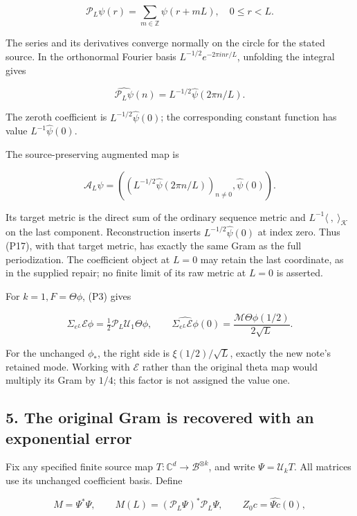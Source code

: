 \[
\mathcal P_L\psi(r)=\sum_{m\in\mathbb Z}\psi(r+mL),\quad 0\le r<L.
\tag{P15}
\]

The series and its derivatives converge normally on the circle for the stated source. In the orthonormal Fourier basis \(L^{-1/2}e^{-2\pi i nr/L}\), unfolding the integral gives

\[
\widehat{\mathcal P_L\psi}(n)
=L^{-1/2}\widehat\psi(2\pi n/L).
\tag{P16}
\]

The zeroth coefficient is \(L^{-1/2}\widehat\psi(0)\); the corresponding constant function has value \(L^{-1}\widehat\psi(0)\).

The source-preserving augmented map is

\[
\mathcal A_L\psi=
\left((L^{-1/2}\widehat\psi(2\pi n/L))_{n\ne0},\widehat\psi(0)\right).
\tag{P17}
\]

Its target metric is the direct sum of the ordinary sequence metric and \(L^{-1}\langle\ ,\ \rangle_{\mathcal K}\) on the last component. Reconstruction inserts \(L^{-1/2}\widehat\psi(0)\) at index zero. Thus (P17), with that target metric, has exactly the same Gram as the full periodization. The coefficient object at \(L=0\) may retain the last coordinate, as in the supplied repair; no finite limit of its raw metric at \(L=0\) is asserted.

For \(k=1,F=\Theta\phi\), (P3) gives

\[
\Sigma_{e^L}\mathcal E\phi
=\tfrac12\mathcal P_L\mathcal U_1\Theta\phi,
\qquad
\widehat{\Sigma_{e^L}\mathcal E\phi}(0)
=\frac{\mathcal M\Theta\phi(1/2)}{2\sqrt L}.
\tag{P18}
\]

For the unchanged \(\phi_*\), the right side is \(\xi(1/2)/\sqrt L\), exactly the new note's retained mode. Working with \(\mathcal E\) rather than the original theta map would multiply its Gram by \(1/4\); this factor is not assigned the value one.

\subsection{5. The original Gram is recovered with an exponential error}\label{endpoint-periodized_original--the-original-gram-is-recovered-with-an-exponential-error}

Fix any specified finite source map \(T:\mathbb C^d\to\mathscr B^{\otimes k}\), and write \(\Psi=\mathcal U_kT\). All matrices use its unchanged coefficient basis. Define

\[
M=\Psi^*\Psi,\qquad M(L)=(\mathcal P_L\Psi)^*\mathcal P_L\Psi,
\qquad Z_0c=\widehat{\Psi c}(0),
\tag{P19}
\]


